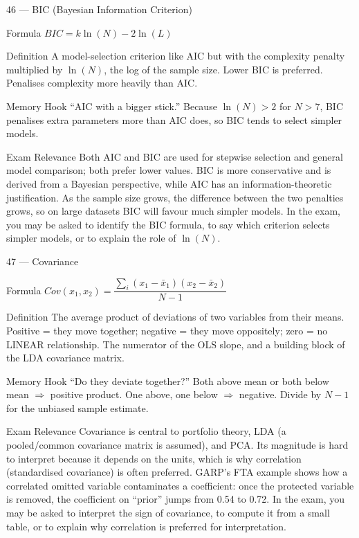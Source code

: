 \documentclass[aspectratio=169,8pt]{beamer}
\begin{document}
	\begin{frame}{46 --- BIC (Bayesian Information Criterion)}
		\begin{block}{Formula}
			$BIC = k\ln(N) - 2\ln(L)$
		\end{block}
		\begin{block}{Definition}
			A model-selection criterion like AIC but with the complexity penalty multiplied by $\ln(N)$, the log of the sample size. Lower BIC is preferred. Penalises complexity more heavily than AIC.
		\end{block}
		\begin{block}{Memory Hook}
			``AIC with a bigger stick.'' Because $\ln(N) > 2$ for $N > 7$, BIC penalises extra parameters more than AIC does, so BIC tends to select simpler models.
		\end{block}
		\begin{block}{Exam Relevance}
			Both AIC and BIC are used for stepwise selection and general model comparison; both prefer lower values. BIC is more conservative and is derived from a Bayesian perspective, while AIC has an information-theoretic justification. As the sample size grows, the difference between the two penalties grows, so on large datasets BIC will favour much simpler models. In the exam, you may be asked to identify the BIC formula, to say which criterion selects simpler models, or to explain the role of $\ln(N)$.
		\end{block}
	\end{frame}
	
	\begin{frame}{47 --- Covariance}
		\begin{block}{Formula}
			$Cov(x_1, x_2) = \dfrac{\sum_i (x_1 - \bar{x}_1)(x_2 - \bar{x}_2)}{N - 1}$
		\end{block}
		\begin{block}{Definition}
			The average product of deviations of two variables from their means. Positive = they move together; negative = they move oppositely; zero = no LINEAR relationship. The numerator of the OLS slope, and a building block of the LDA covariance matrix.
		\end{block}
		\begin{block}{Memory Hook}
			``Do they deviate together?'' Both above mean or both below mean $\Rightarrow$ positive product. One above, one below $\Rightarrow$ negative. Divide by $N - 1$ for the unbiased sample estimate.
		\end{block}
		\begin{block}{Exam Relevance}
			Covariance is central to portfolio theory, LDA (a pooled/common covariance matrix is assumed), and PCA. Its magnitude is hard to interpret because it depends on the units, which is why correlation (standardised covariance) is often preferred. GARP's FTA example shows how a correlated omitted variable contaminates a coefficient: once the protected variable is removed, the coefficient on ``prior'' jumps from 0.54 to 0.72. In the exam, you may be asked to interpret the sign of covariance, to compute it from a small table, or to explain why correlation is preferred for interpretation.
		\end{block}
	\end{frame}
	
\end{document}
